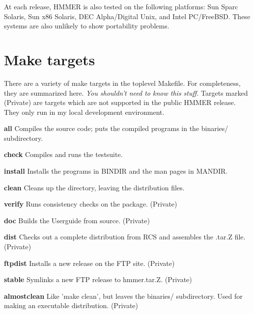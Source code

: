 At each release, HMMER is also tested on the following platforms: Sun
Sparc Solaris, Sun x86 Solaris, DEC Alpha/Digital Unix, and Intel
PC/FreeBSD. These systems are also unlikely to show portability
problems.

\section{Make targets}

There are a variety of make targets in the toplevel Makefile.  For
completeness, they are summarized here. \textit{You shouldn't need to
know this stuff.} Targets marked (Private) are targets which are not
supported in the public HMMER release. They only run in my local
development environment.

\begin{wideitem}
\item[\textbf{all}]  Compiles the source code; puts the compiled
programs in the binaries/ subdirectory.
 
\item[\textbf{check}]  Compiles and runs the testsuite.

\item[\textbf{install}] Installs the programs in BINDIR and
the man pages in MANDIR.

\item[\textbf{clean}] Cleans up the directory, leaving the
distribution files.

\item[\textbf{verify}] Runs consistency checks on the package.
(Private)

\item[\textbf{doc}] Builds the Userguide from \latex source. (Private)

\item[\textbf{dist}] Checks out a complete distribution from RCS
and assembles the .tar.Z file. (Private)

\item[\textbf{ftpdist}] Installs a new release on the FTP
site. (Private)

\item[\textbf{stable}] Symlinks a new FTP release to hmmer.tar.Z. (Private)

\item[\textbf{almostclean}] Like 'make clean', but leaves the
binaries/ subdirectory. Used for making an executable distribution.
(Private)
\end{wideitem}







